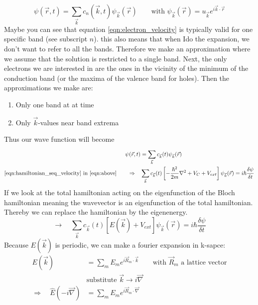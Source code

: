 \begin{myproof}
	\begin{equation}
		\psi(\vec{r}, t) = \sum_{\vec{k}}^{}c_n(\vec{k}, t)\psi_{\vec{k}}(\vec{r}) \qquad \text{with } \psi_{\vec{k}}(\vec{r}) = u_{\vec{k}}e^{i\vec{k}\cdot\vec{r}}
	\end{equation}
	Maybe you can see that equation \ref{eqn:electron_velocity} is typically valid for one specific band (see subscript $n$). this also means that when Ido the expansion, we don't want to refer to all the bands. Therefore we make an approximation where we assume that the solution is restricted to a single band. Next, the only electrons we are interested in are the ones in the vicinity of the minimum of the conduction band (or the maxima of the valence band for holes).
	Then the approximations we make are:
	\begin{enumerate}
		\setlength\itemsep{0pt}
		\item Only one band at at time
		\item Only $\vec{k}$-values near band extrema
	\end{enumerate}
	Thus our wave function will become
	\begin{align}
		\psi(\vec{r}, t) &= \sum_{\vec{k}}^{}c_{\vec{k}}(t)\psi_{\vec{k}}(\vec{r}) \label{eqn:above} \\
		\ref{eqn:hamiltonian_seq_velocity} \text{ in } \ref{eqn:above} \qquad \Rightarrow \quad & \sum_{\vec{k}}^{} c_{\vec{k}}(t)\left[-\frac{\hbar^2}{2m}\nabla^2 + V_C + V_{ext}\right]\psi_{\vec{k}}(\vec{r}) = i\hbar\frac{\delta \psi}{\delta t}
	\end{align}
	If we look at the total hamiltonian acting on the eigenfunction of the Bloch hamiltonian meaning the wavevector is an eigenfunction of the total hamiltonian. Thereby we can replace the hamiltonian by the eigenenergy.
	\begin{equation}
		\rightarrow \quad \sum_{\vec{k}}^{} c_{\vec{k}}(t)\left[E(\vec{k}) + V_{ext}\right]\psi_{\vec{k}}(\vec{r}) = i\hbar\frac{\delta \psi}{\delta t} \label{eqn:toconcludeproof}
	\end{equation}
	Because $E(\vec{k})$ is periodic, we can make a fourier expansion in k-sapce:
	\begin{align}
		E(\vec{k}) &= \sum_m^{}E_me^{i\vec{R}_m\cdot\vec{k}} \qquad \text{with $\vec{R}_m$ a lattice vector}\\
		& \text{substitute } \vec{k} \rightarrow i\vec{\nabla} \nonumber \\
		\Rightarrow \quad \hat{E}(-i\vec{\nabla}) &= \sum_m^{}E_me^{i\vec{R}_m\cdot\vec{\nabla}} \label{eqn:engery_nabla}

\end{align}
\end{myproof}
